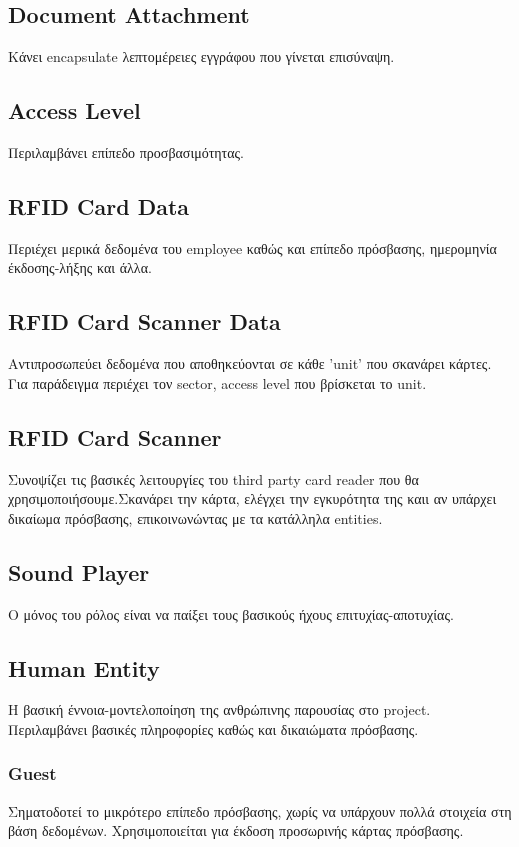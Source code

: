 \documentclass{article}
\begin{document}
\subsection{Document Attachment}
Κάνει encapsulate λεπτομέρειες εγγράφου που γίνεται επισύναψη.

\subsection{Access Level}
Περιλαμβάνει επίπεδο προσβασιμότητας.

\subsection{RFID Card Data}
Περιέχει μερικά δεδομένα του employee καθώς και επίπεδο πρόσβασης, ημερομηνία έκδοσης-λήξης και άλλα.

\subsection{RFID Card Scanner Data}
Αντιπροσωπεύει δεδομένα που αποθηκεύονται σε κάθε 'unit' που σκανάρει κάρτες. Για παράδειγμα περιέχει τον sector, access level που βρίσκεται το unit.

\subsection{RFID Card Scanner}
Συνοψίζει τις βασικές λειτουργίες του third party card reader που θα χρησιμοποιήσουμε.Σκανάρει την κάρτα, ελέγχει την εγκυρότητα της καιι αν υπάρχει δικαίωμα πρόσβασης, επικοινωνώντας με τα κατάλληλα entities.

\subsection{Sound Player}
Ο μόνος του ρόλος είναι να παίξει τους βασικούς ήχους επιτυχίας-αποτυχίας.

\subsection{Human Entity}
Η βασική έννοια-μοντελοποίηση της ανθρώπινης παρουσίας στο project. Περιλαμβάνει βασικές πληροφορίες καθώς και δικαιώματα πρόσβασης.

\subsubsection{Guest}
Σηματοδοτεί το μικρότερο επίπεδο πρόσβασης, χωρίς να υπάρχουν πολλά στοιχεία στη βάση δεδομένων. Χρησιμοποιείται για έκδοση προσωρινής κάρτας πρόσβασης.
\end{document}
